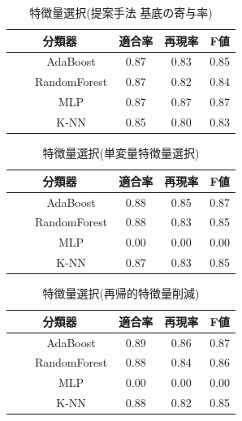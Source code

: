 \documentclass[12pt,a4paper,twocolumn,twoside]{jsik}
\begin{document}
\begin{table}[htb]
  \caption{特徴量選択(提案手法 基底の寄与率)} 
  \label{tab:nmf_class_proposed_stackoverflow}
  \begin{center}
  \begin{tabular}{c|c|c|c} \hline
    分類器 & 適合率 & 再現率 & F値 \\ \hline \hline
　　AdaBoost & 0.87 & 0.83 & 0.85 \\ \hline
　　RandomForest & 0.87 & 0.82 & 0.84 \\ \hline
　　MLP & 0.87 & 0.87 & 0.87 \\ \hline
　　K-NN & 0.85 & 0.80 & 0.83 \\ \hline
  \end{tabular}
  \end{center}
\end{table}
%
\begin{table}[htb]
  \caption{特徴量選択(単変量特徴量選択)} 
  \label{tab:nmf_class_related1_stackoverflow}
  \begin{center}
  \begin{tabular}{c|c|c|c} \hline
    分類器 & 適合率 & 再現率 & F値 \\ \hline \hline
　　AdaBoost & 0.88 & 0.85 & 0.87 \\ \hline
　　RandomForest & 0.88 & 0.83 & 0.85 \\ \hline
　　MLP & 0.00 & 0.00 & 0.00 \\ \hline
　　K-NN & 0.87 & 0.83 & 0.85 \\ \hline
  \end{tabular}
  \end{center}
\end{table}
%
\begin{table}[htb]
  \caption{特徴量選択(再帰的特徴量削減)} 
  \label{tab:nmf_class_related2_stackoverflow}
  \begin{center}
  \begin{tabular}{c|c|c|c} \hline
    分類器 & 適合率 & 再現率 & F値 \\ \hline \hline
　　AdaBoost & 0.89 & 0.86 & 0.87 \\ \hline
　　RandomForest & 0.88 & 0.84 & 0.86  \\ \hline
　　MLP & 0.00 & 0.00 & 0.00  \\ \hline
　　K-NN & 0.88 & 0.82 & 0.85  \\ \hline
  \end{tabular}
  \end{center}
\end{table}
\end{document}
